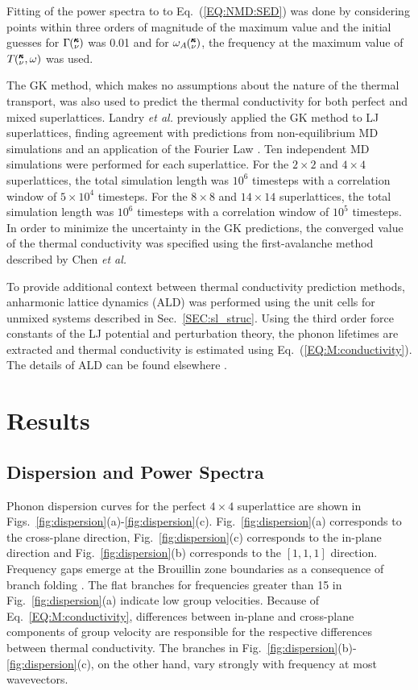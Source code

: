 Fitting of the power spectra to  to Eq.~(\ref{EQ:NMD:SED}) was done by considering points within three orders of magnitude of the maximum value and the initial guesses for $\Gamma\mspace{-4.0mu}\left(\mspace{-8.0mu} \begin{smallmatrix}&\pmb{\kappa} \\&\nu\end{smallmatrix} \mspace{-3.0mu}\right)$ was 0.01 and for $\omega_A\mspace{-4.0mu}\left(\mspace{-8.0mu} \begin{smallmatrix}&\pmb{\kappa} \\&\nu\end{smallmatrix} \mspace{-3.0mu}\right)$, the frequency at the maximum value of $T\mspace{-4.0mu}\left(\mspace{-8.0mu} \begin{smallmatrix}&\pmb{\kappa} \\&\nu\end{smallmatrix} \mspace{-2.0mu},\omega\right)$ was used. 

The GK method, which makes no assumptions about the nature of the thermal transport, was also used to predict the thermal conductivity for both perfect and mixed superlattices. Landry \textit{et al.} previously applied the GK method to LJ superlattices, finding agreement with predictions from non-equilibrium MD simulations and an application of the Fourier Law \cite{PhysRevB.79.075316}.
Ten independent MD simulations were performed for each superlattice. For the $2 \times 2$ and $4 \times 4$ superlattices, the total  simulation length was $10^6$ timesteps with a correlation window of $5\times 10^4$ timesteps.  For the $8 \times 8$ and $14 \times 14$ superlattices, the total  simulation length was $10^6$ timesteps with a correlation window of $10^5$ timesteps. In order to minimize the uncertainty in the GK predictions, the converged value of the thermal conductivity was specified using the first-avalanche method described by Chen \textit{et al.} \cite{Chen20102392}

To provide additional context between thermal conductivity prediction methods, anharmonic lattice dynamics (ALD) was performed using the unit cells for unmixed systems described in Sec.~\ref{SEC:sl_struc}. Using the third order force constants of the LJ potential and perturbation theory, the phonon lifetimes are extracted and thermal conductivity is estimated using Eq.~(\ref{EQ:M:conductivity}). The details of ALD can be found elsewhere \cite{PhysRevB.79.064301}.

\section{Results}\label{SEC:results}
\subsection{Dispersion and Power Spectra}

Phonon dispersion curves for the perfect $4\times4$ superlattice are shown in Figs.~\ref{fig:dispersion}(a)-\ref{fig:dispersion}(c). Fig.~\ref{fig:dispersion}(a) corresponds to the cross-plane direction, Fig.~\ref{fig:dispersion}(c) corresponds to the in-plane direction and Fig.~\ref{fig:dispersion}(b) corresponds to the $[1,1,1]$ direction. Frequency gaps emerge at the Brouillin zone boundaries as a consequence of branch folding \cite{PhysRevB.38.1427,PhysRevB.60.2627}. The flat branches for frequencies greater than 15 in Fig.~\ref{fig:dispersion}(a) indicate low group velocities. Because of Eq.~\ref{EQ:M:conductivity}, differences between in-plane and cross-plane components of group velocity are responsible for the respective differences between thermal conductivity. The branches in Fig.~\ref{fig:dispersion}(b)-\ref{fig:dispersion}(c), on the other hand, vary strongly with frequency at most wavevectors. 

